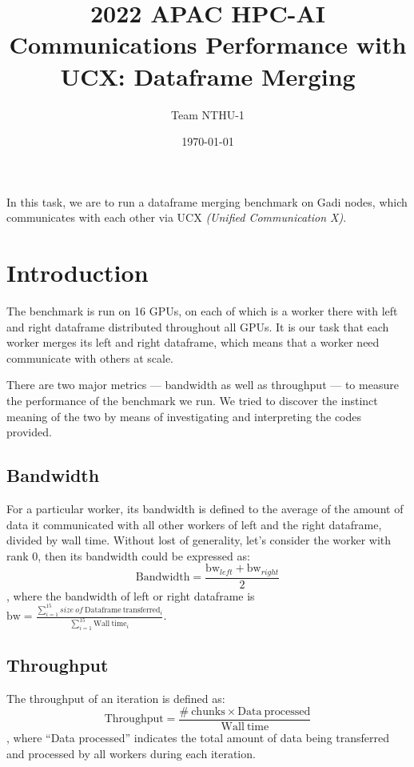 \documentclass{article}
\title{2022 APAC HPC-AI\\Communications Performance with \textsf{UCX}: Dataframe Merging}
\author{Team NTHU-1}
\date{\today}
\begin{document}
\maketitle

\tableofcontents
\listoftables

In this task, we are to run a dataframe merging benchmark on Gadi nodes, which communicates with each other via \textsf{UCX} \textit{(Unified Communication X)}.

\section{Introduction}

The benchmark is run on 16 GPUs, on each of which is a worker there with left and right dataframe distributed throughout all GPUs. It is our task that each worker merges its left and right dataframe, which means that a worker need communicate with others at scale.

There are two major metrics --- bandwidth as well as throughput --- to measure the performance of the benchmark we run. We tried to discover the instinct meaning of the two by means of investigating and interpreting the codes provided.

\subsection{Bandwidth}

For a particular worker, its bandwidth is defined to the average of the amount of data it communicated with all other workers of left and the right dataframe, divided by wall time. Without lost of generality, let's consider the worker with rank 0, then its bandwidth could be expressed as: $$\mathrm{Bandwidth}=\frac{\mathrm{bw}_{left}+\mathrm{bw}_{right}}{2}$$, where the bandwidth of left or right dataframe is $\mathrm{bw}=\frac{\displaystyle\sum_{i=1}^{15}size\ of\ \mathrm{Dataframe\ transferred}_i}{\displaystyle\sum_{i=1}^{15}\mathrm{Wall\ time}_i}$.

\subsection{Throughput}

The throughput of an iteration is defined as: $$\mathrm{Throughput}=\frac{\mathrm{\#\ chunks}\times\mathrm{Data\ processed}}{\mathrm{Wall\ time}}$$, where ``Data processed'' indicates the total amount of data being transferred and processed by all workers during each iteration.
\end{document}
